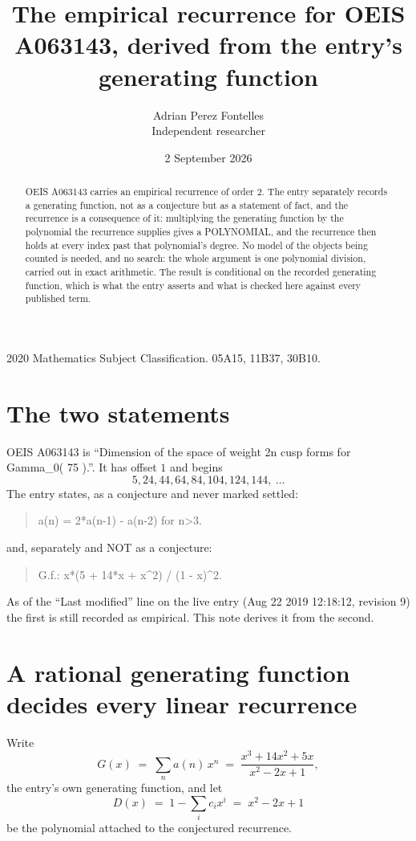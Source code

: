 \documentclass[11pt,a4paper]{article}
\title{The empirical recurrence for OEIS A063143, derived from the entry's generating function}
\author{Adrian Perez Fontelles\\ \small Independent researcher}
\date{2 September 2026}
\theoremstyle{plain}
\theoremstyle{definition}
\begin{document}
\maketitle

\begin{abstract}
OEIS A063143 carries an empirical recurrence of order $2$. The entry separately records a
generating function, not as a conjecture but as a statement of fact, and the recurrence is a
consequence of it: multiplying the generating function by the polynomial the recurrence
supplies gives a POLYNOMIAL, and the recurrence then holds at every index past that
polynomial's degree. No model of the objects being counted is needed, and no search: the
whole argument is one polynomial division, carried out in exact arithmetic. The result is
conditional on the recorded generating function, which is what the entry asserts and what is
checked here against every published term.
\end{abstract}

\noindent\small 2020 Mathematics Subject Classification. 05A15, 11B37, 30B10.\normalsize

\section{The two statements}

OEIS A063143 is ``Dimension of the space of weight 2n cusp forms for Gamma\_0( 75 ).''. It has offset $1$ and begins
\[
5, 24, 44, 64, 84, 104, 124, 144,\ \dots
\]
The entry states, as a conjecture and never marked settled:
\begin{quote}
a(n) = 2*a(n-1) - a(n-2) for n>3.
\end{quote}
and, separately and NOT as a conjecture:
\begin{quote}
G.f.: x*(5 + 14*x + x\^{}2) / (1 - x)\^{}2.
\end{quote}
As of the ``Last modified'' line on the live entry (Aug 22 2019 12:18:12, revision 9) the first is still
recorded as empirical. This note derives it from the second.

\section{A rational generating function decides every linear recurrence}

Write
\[
G(x)\;=\;\sum_{n}a(n)\,x^{n}\;=\;\frac{x^{3} + 14 x^{2} + 5 x}{x^{2} - 2 x + 1},
\]
the entry's own generating function, and let
\[
D(x)\;=\;1-\sum_i c_i x^{i}\;=\;x^{2} - 2 x + 1
\]
be the polynomial attached to the conjectured recurrence.
\end{document}
